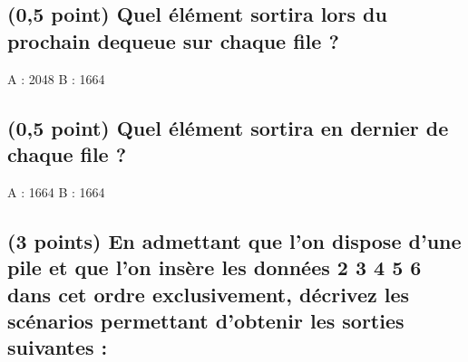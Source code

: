 \documentclass[11pt,a4paper]{article}
\begin{document}
\bigskip


\subsection{(0,5 point) Quel élément sortira lors du prochain \og dequeue \fg{} sur chaque file ? }

\bigskip
\bigskip

\begin{Large}
A : 2048 \hspace{8cm}  B : 1664
\end{Large}

\bigskip
\bigskip


\subsection{(0,5 point) Quel élément sortira en dernier de chaque file ? }

\bigskip
\bigskip

\begin{Large}
A : 1664 \hspace{8cm}  B : 1664
\end{Large}

\bigskip
\bigskip



\hspace{0pt}
\vfill

\newpage

\vfillFirst

\subsection{(3 points) En admettant que l'on dispose d'une pile et que l'on insère les données  2 3 4 5 6 \fg{} dans cet ordre exclusivement, décrivez les scénarios permettant d'obtenir les sorties suivantes : }
\end{document}
